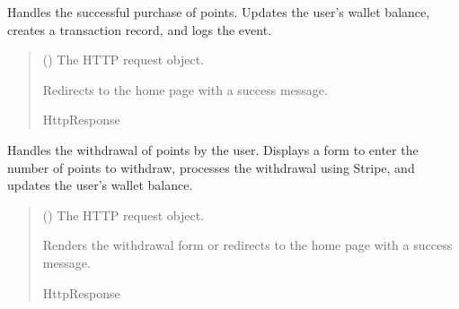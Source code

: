 \documentclass[letterpaper,10pt,english]{sphinxmanual}
\begin{document}
\begin{fulllineitems}
\label{\detokenize{modules/views:finances.views.purchase_success}}
\pysigstartsignatures
{}
\pysigstopsignatures
\sphinxAtStartPar
Handles the successful purchase of points. Updates the user’s wallet balance, creates a transaction record,
and logs the event.
\begin{quote}\begin{description}
\sphinxAtStartPar
{} () \textendash{} The HTTP request object.

\sphinxAtStartPar
Redirects to the home page with a success message.

\sphinxAtStartPar
HttpResponse

\end{description}\end{quote}

\end{fulllineitems}


\begin{fulllineitems}
\label{\detokenize{modules/views:finances.views.withdraw_points}}
\pysigstartsignatures
{}
\pysigstopsignatures
\sphinxAtStartPar
Handles the withdrawal of points by the user. Displays a form to enter the number of points to withdraw,
processes the withdrawal using Stripe, and updates the user’s wallet balance.
\begin{quote}\begin{description}
\sphinxAtStartPar
{} () \textendash{} The HTTP request object.

\sphinxAtStartPar
Renders the withdrawal form or redirects to the home page with a success message.

\sphinxAtStartPar
HttpResponse

\end{description}\end{quote}

\end{fulllineitems}
\end{document}
